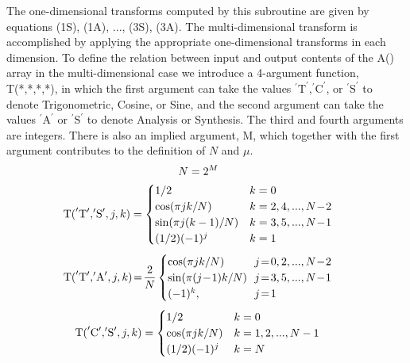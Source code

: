 \documentclass[twoside]{MATH77}
\begin{document}
The one-dimensional transforms computed by this subroutine are given by
equations (1S), (1A), ..., (3S), (3A). The multi-dimensional transform is
accomplished by applying the appropriate one-dimensional transforms in each
dimension. To define the relation between input and output contents of the
A() array in the multi-dimensional case we introduce a 4-argument function,
T(*,*,*,*), in which the first argument can take the values $%
^{\prime }\text{T}^{\prime }$,$^{\prime }\text{C}^{\prime }$,
or $^{\prime }\text{S}^{\prime }$
to denote Trigonometric, Cosine, or Sine, and the second argument can take
the values $^{\prime }\text{A}^{\prime }$ or $^{\prime }\text{S}^{\prime }$
to denote Analysis or Synthesis. The third and fourth arguments are integers.
There is also an implied argument, M, which together with the first
argument contributes to the definition of $N$ and $\mu $.
\begin{equation*}
\hspace{-15pt}N=2^M
\end{equation*}\vspace{-30pt}
\begin{equation*}
\hspace{-15pt}\text{T(}^{\prime }\text{T}^{\prime }{,}^{\prime }
\text{S}^{\prime },j,k)=\begin{cases}
1/2 & k=0\\
\cos (\pi jk/N)& k=2,4,...,N\!-\!2\\
\sin (\pi j(k-1)/N)& k=3,5,...,N\!-\!1\\
(1/2)(-1)^j& k=1
\end{cases}
\end{equation*}\vspace{-10pt}
\begin{equation*}
\hspace{-15pt}\text{T(}^{\prime }\text{T}^{\prime }{,}^{\prime }
\text{A}^{\prime },j,k)\!=\!\frac 2N
\begin{cases}
\cos (\pi jk/N)&\!\!j\!=\!0,2,...,N\!-\!2 \\
\sin (\pi (j\!-\!1)k/N)&\!\!j\!=\!3,5,...,N\!-\!1 \\
(-1)^k,&\!\!j\!=\!1
\end{cases}
\end{equation*}\vspace{-15pt}
\begin{equation*}
\hspace{-15pt}\text{T(}^{\prime }\text{C}^{\prime }{,}^{\prime }
\text{S}^{\prime },j,k)=
\begin{cases}
1/2& k=0 \\
\cos (\pi jk/N)& k=1,2,...,N-1 \\
(1/2)(-1)^j& k=N
\end{cases}
\end{equation*}\vspace{-15pt}
\end{document}
